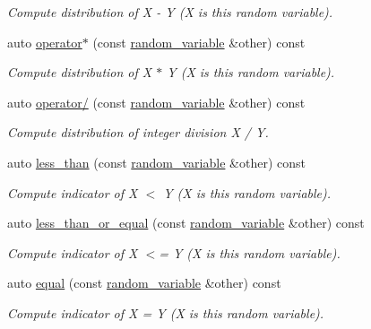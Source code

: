 \begin{DoxyCompactItemize}
\begin{DoxyCompactList}\small\item\em Compute distribution of X -\/ Y (X is this random variable). \end{DoxyCompactList}\item 
auto \mbox{\hyperlink{classdice_1_1random__variable_ac420c3a819add2d6115dfe5071f40b8e}{operator$\ast$}} (const \mbox{\hyperlink{classdice_1_1random__variable}{random\+\_\+variable}} \&other) const
\begin{DoxyCompactList}\small\item\em Compute distribution of X $\ast$ Y (X is this random variable). \end{DoxyCompactList}\item 
auto \mbox{\hyperlink{classdice_1_1random__variable_a52896f8ba19758fc240d6e8f51b650e7}{operator/}} (const \mbox{\hyperlink{classdice_1_1random__variable}{random\+\_\+variable}} \&other) const
\begin{DoxyCompactList}\small\item\em Compute distribution of integer division X / Y. \end{DoxyCompactList}\item 
auto \mbox{\hyperlink{classdice_1_1random__variable_a8447981f77852b91874f1f888dae50ac}{less\+\_\+than}} (const \mbox{\hyperlink{classdice_1_1random__variable}{random\+\_\+variable}} \&other) const
\begin{DoxyCompactList}\small\item\em Compute indicator of X $<$ Y (X is this random variable). \end{DoxyCompactList}\item 
auto \mbox{\hyperlink{classdice_1_1random__variable_ac384c7a722412306ea7af080ceb8a8c5}{less\+\_\+than\+\_\+or\+\_\+equal}} (const \mbox{\hyperlink{classdice_1_1random__variable}{random\+\_\+variable}} \&other) const
\begin{DoxyCompactList}\small\item\em Compute indicator of X $<$= Y (X is this random variable). \end{DoxyCompactList}\item 
auto \mbox{\hyperlink{classdice_1_1random__variable_ac66bb2ec2b0d9a67029a3a9381d02d61}{equal}} (const \mbox{\hyperlink{classdice_1_1random__variable}{random\+\_\+variable}} \&other) const
\begin{DoxyCompactList}\small\item\em Compute indicator of X = Y (X is this random variable). \end{DoxyCompactList}\item 

\end{DoxyCompactItemize}
